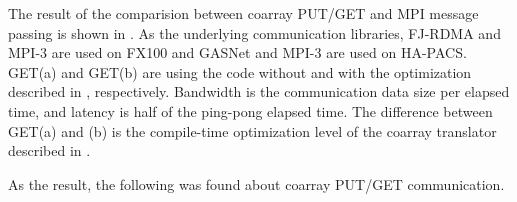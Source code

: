 The result of the comparision between coarray PUT/GET and MPI message passing is shown in
.
As the underlying communication libraries, 
FJ-RDMA and MPI-3 are used on FX100 and GASNet and MPI-3 are used on HA-PACS.
GET(a) and GET(b) are using the code without and with the optimization described in
, respectively.
Bandwidth is the communication data size per elapsed time, and
latency is half of the ping-pong elapsed time.
The difference between GET(a) and (b) is the compile-time optimization level of the 
coarray translator described in .



As the result, the following was found about coarray PUT/GET communication.

